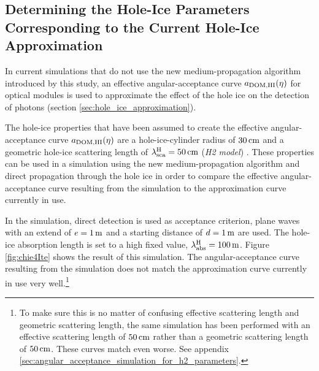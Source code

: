 \subsection{Determining the Hole-Ice Parameters Corresponding to the Current Hole-Ice Approximation}
\label{sec:parameter_scan}

In current \clsim simulations that do not use the new medium-propagation
algorithm introduced by this study, an effective angular-acceptance
curve \(a_\text{DOM,HI}(\eta)\) for optical modules is used to approximate the
effect of the hole ice on the detection of photons (section
\ref{sec:hole_ice_approximation}).

The hole-ice properties that have been assumed to create the effective
angular-acceptance curve \(a_\text{DOM,HI}(\eta)\) are a hole-ice-cylinder
radius of \(30\text{\,cm}\) and a geometric hole-ice scattering length of
\(\lambda_\text{sca}^\text{H} = 50\text{\,cm}\) (\textit{H2 model})
\cite{holeicestudieswithyag}. These properties can be used in a
\clsim simulation using the new medium-propagation algorithm and direct
propagation through the hole ice in order to compare the effective
angular-acceptance curve resulting from the simulation to the
approximation curve currently in use.


In the simulation, direct detection is used as acceptance criterion,
plane waves with an extend of \(e=1\text{\,m}\) and a starting distance of
\(d=1\text{\,m}\) are used. The hole-ice absorption length is set to a high
fixed value, \(\lambda_\text{abs}^\text{H} = 100\text{\,m}\). Figure \ref{fig:chie4Ite} shows
the result of this simulation. The angular-acceptance curve resulting
from the simulation does not match the approximation curve currently in
use very
well.\footnote{To make sure this is no matter of confusing effective scattering length and geometric scattering length, the same simulation has been performed with an effective scattering length of $50\text{\,cm}$ rather than a geometric scattering length of $50\text{\,cm}$. These curves match even worse. See appendix \ref{sec:angular_acceptance_simulation_for_h2_parameters}.}

